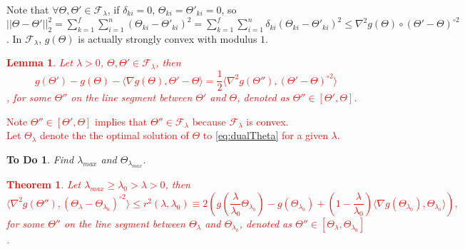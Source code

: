 \documentclass{article}
\newtheorem{theorem}{Theorem}
\newtheorem{lemma}{Lemma}
\newtheorem{todo}{To Do}
\providecommand{\note}[1]{\textcolor{red}{#1}}
\begin{document}
Note that $\forall\Theta,\Theta'\in\mathcal{F}_\lambda$, if $\delta_{ki}=0$, $\Theta_{ki}=\Theta'_{ki}=0$, so $||\Theta-\Theta'||_2^2=\sum_{k=1}^f\sum_{i=1}^n(\Theta_{ki}-\Theta'_{ki})^2=\sum_{k=1}^f\sum_{i=1}^n\delta_{ki}(\Theta_{ki}-\Theta'_{ki})^2\leq \nabla^2 g(\Theta)\circ(\Theta'-\Theta)^{\circ 2}$. In $\mathcal{F}_\lambda$, $g(\Theta)$ is actually strongly convex with modulus $1$.


\note{
\begin{lemma}
    \label{lem:1}
    Let $\lambda>0$, $\Theta,\Theta'\in\mathcal{F}_\lambda$, then
    \begin{equation}
        \label{eq:expand}
        g(\Theta')-g(\Theta)-\langle\nabla g(\Theta),\Theta'-\Theta\rangle=\frac{1}{2}\langle\nabla^2 g(\Theta''),(\Theta'-\Theta)^{\circ 2}\rangle%
    \end{equation},
    for some $\Theta''$ on the line segment between $\Theta'$ and $\Theta$, denoted as $\Theta''\in[\Theta',\Theta]$.
\end{lemma}
Note $\Theta''\in[\Theta',\Theta]$ implies that $\Theta''\in\mathcal{F}_\lambda$ because $\mathcal{F}_\lambda$ is convex.\\
Let $\Theta_\lambda$ denote the the optimal solution of $\Theta$ to \eqref{eq:dualTheta} for a given $\lambda$.
}


\begin{todo}
    Find $\lambda_{max}$ and $\Theta_{\lambda_{max}}$.
\end{todo}

\note{
\begin{theorem}
    \label{thm:1}
    Let $\lambda_{max}\geq\lambda_0>\lambda>0$, then
    \begin{equation}
        \langle\nabla^2 g(\Theta''),(\Theta_\lambda-\Theta_{\lambda_0})^{\circ 2}\rangle\leq r^2(\lambda,\lambda_0)\equiv 2\left(g\left(\frac{\lambda}{\lambda_0}\Theta_{\lambda_0}\right)-g(\Theta_{\lambda_0})+\left(1-\frac{\lambda}{\lambda_0}\right)\langle\nabla g(\Theta_{\lambda_0}),\Theta_{\lambda_0}\rangle\right),
    \end{equation}
    for some $\Theta''$ on the line segment between $\Theta_\lambda$ and $\Theta_{\lambda_0}$, denoted as $\Theta''\in[\Theta_\lambda,\Theta_{\lambda_0}]$.
\end{theorem}
}
\end{document}
